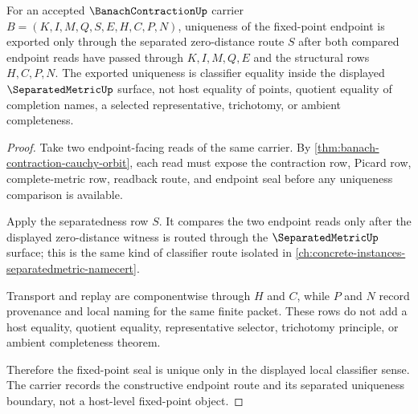 \begin{theorem}
\label{thm:banach-contraction-unique-fixed-point-seal}
For an accepted $\BanachContractionUp$ carrier $B=(K,I,M,Q,S,E,H,C,P,N)$, uniqueness of the fixed-point endpoint is exported only through the separated zero-distance route $S$ after both compared endpoint reads have passed through $K,I,M,Q,E$ and the structural rows $H,C,P,N$. The exported uniqueness is classifier equality inside the displayed $\SeparatedMetricUp$ surface, not host equality of points, quotient equality of completion names, a selected representative, trichotomy, or ambient completeness.
\end{theorem}
\begin{proof}
Take two endpoint-facing reads of the same carrier. By \autoref{thm:banach-contraction-cauchy-orbit}, each read must expose the contraction row, Picard row, complete-metric row, readback route, and endpoint seal before any uniqueness comparison is available.

Apply the separatedness row $S$. It compares the two endpoint reads only after the displayed zero-distance witness is routed through the $\SeparatedMetricUp$ surface; this is the same kind of classifier route isolated in \autoref{ch:concrete-instances-separatedmetric-namecert}.

Transport and replay are componentwise through $H$ and $C$, while $P$ and $N$ record provenance and local naming for the same finite packet. These rows do not add a host equality, quotient equality, representative selector, trichotomy principle, or ambient completeness theorem.

Therefore the fixed-point seal is unique only in the displayed local classifier sense. The carrier records the constructive endpoint route and its separated uniqueness boundary, not a host-level fixed-point object.
\end{proof}



